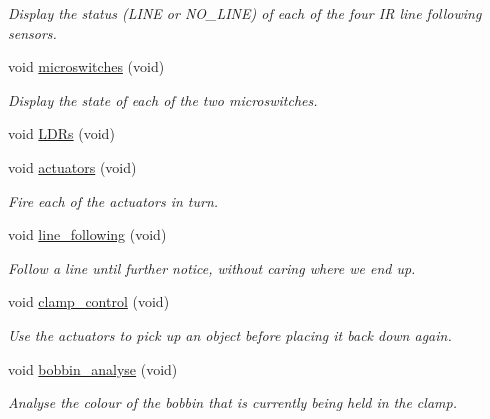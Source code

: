 \begin{DoxyCompactItemize}
\begin{DoxyCompactList}\small\item\em Display the status (LINE or NO\_\-LINE) of each of the four IR line following sensors. \item\end{DoxyCompactList}\item 
void \hyperlink{classIDP_1_1SelfTests_a6b2e4d0517de4b73c63f1b1a475b602f}{microswitches} (void)
\begin{DoxyCompactList}\small\item\em Display the state of each of the two microswitches. \item\end{DoxyCompactList}\item 
void \hyperlink{classIDP_1_1SelfTests_a56952650637691f869ef21f7d43f1226}{LDRs} (void)
\item 
void \hyperlink{classIDP_1_1SelfTests_a0ca765ac144fafaab502f4326a480486}{actuators} (void)
\begin{DoxyCompactList}\small\item\em Fire each of the actuators in turn. \item\end{DoxyCompactList}\item 
void \hyperlink{classIDP_1_1SelfTests_a0a1a40b56fee5249def567bebdb05dc1}{line\_\-following} (void)
\begin{DoxyCompactList}\small\item\em Follow a line until further notice, without caring where we end up. \item\end{DoxyCompactList}\item 
void \hyperlink{classIDP_1_1SelfTests_a896204355ca039660a12e8131578b6c3}{clamp\_\-control} (void)
\begin{DoxyCompactList}\small\item\em Use the actuators to pick up an object before placing it back down again. \item\end{DoxyCompactList}\item 
void \hyperlink{classIDP_1_1SelfTests_a66f0a3bad277e36b963b2bf3cd5df9dd}{bobbin\_\-analyse} (void)
\begin{DoxyCompactList}\small\item\em Analyse the colour of the bobbin that is currently being held in the clamp. \item\end{DoxyCompactList}\item 

\end{DoxyCompactItemize}
